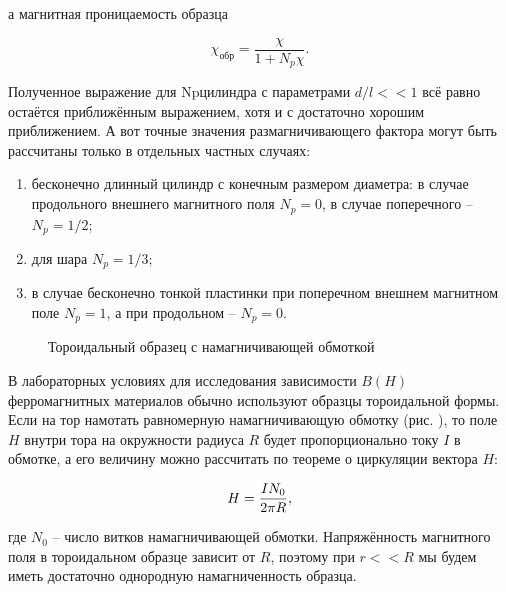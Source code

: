 а  магнитная проницаемость образца

\begin{equation*}
	\chi_{\text{обр}} = \frac{\chi}{1 + N_p \chi}.
\end{equation*}


Полученное выражение для Npцилиндра с параметрами $d/l << 1$ всё равно остаётся приближённым выражением, хотя и с достаточно хорошим приближением. А вот точные значения размагничивающего фактора могут быть рассчитаны только в отдельных частных случаях:
\begin{enumerate}
	\item бесконечно длинный цилиндр с конечным размером диаметра: 
в случае продольного внешнего магнитного поля $N_p = 0$, в случае 
поперечного -- $N_p = 1/2$;
	\item для шара $ N_p = 1/3$;
	\item в случае бесконечно тонкой пластинки при поперечном внешнем магнитном поле $N_p = 1$, а при продольном -- $N_p = 0$.
\end{enumerate}


\begin{wrapfigure}{r}{0.4\textwidth}
	\caption{Тороидальный образец с намагничивающей обмоткой}
\end{wrapfigure}

В лабораторных условиях для исследования зависимости $B(H)$ ферромагнитных материалов обычно используют образцы тороидальной формы. Если на тор намотать равномерную намагничивающую обмотку (рис. ), то поле $H$ внутри тора на окружности радиуса $R$ будет пропорционально току $I$ в обмотке, а его величину можно рассчитать по теореме о циркуляции вектора $H$:

\begin{equation}
	\eqmark{H-toroid}
	H = \frac{IN_0}{2\pi R},
\end{equation}

где $N_0$ -- число витков намагничивающей обмотки. Напряжённость магнитного поля в тороидальном образце зависит от $R$, поэтому при $r<<R$ мы будем иметь достаточно однородную намагниченность образца.

